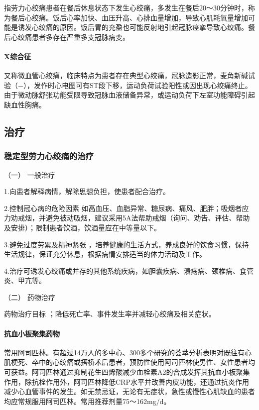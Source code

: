 指劳力心绞痛患者在餐后休息状态下发生心绞痛，多发生在餐后20～30分钟时，称为餐后心绞痛。饭后心率加快、血压升高、心排血量增加，导致心肌耗氧量增加可能是诱发心绞痛的原因。饭后胃的充盈也可能反射地引起冠脉痉挛导致心绞痛。餐后心绞痛患者多存在严重多支冠脉病变。

\paragraph{X综合征}

又称微血管心绞痛，临床特点为患者存在典型心绞痛，冠脉造影正常，麦角新碱试验（−），发作时心电图可有ST段下移，运动负荷试验阳性或因出现心绞痛终止。由于微动脉舒张功能受限导致冠脉血液储备异常，或运动负荷下左室功能障碍引起缺血性胸痛。

\subsection{治疗}

\subsubsection{稳定型劳力心绞痛的治疗}

\hypertarget{text00309.htmlux5cux23CHP10-7-3-1-1}{}
（一） 一般治疗

1.向患者解释病情，解除思想负担，使患者配合治疗。

2.控制冠心病的危险因素
如高血压、血脂异常、糖尿病、痛风、肥胖；吸烟者应力劝戒烟，并避免被动吸烟，建议采用5A法帮助戒烟（询问、劝告、评估、帮助及安排）；限制患者饮酒，饮酒量应在中等量以下。

3.避免过度劳累及精神紧张
，培养健康的生活方式，养成良好的饮食习惯，保持生活规律，保证充分休息，根据病情安排适当的体力活动及工作。

4.治疗可诱发心绞痛或并存的其他系统疾病，如胆囊疾病、溃疡病、颈椎病、食管炎、甲亢等。

\hypertarget{text00309.htmlux5cux23CHP10-7-3-1-2}{}
（二） 药物治疗

药物治疗目标 ；降低死亡率、事件发生率并减轻心绞痛及相关症状。

\paragraph{抗血小板聚集药物}

常用阿司匹林。有超过14万人的多中心、300多个研究的荟萃分析表明对既往有心肌梗死、卒中的心绞痛或搭桥术后患者，预防性使用阿司匹林使男性、女性患者均可获益。阿司匹林通过抑制花生四烯酸减少血栓素A2的合成发挥其抗血小板聚集作用，除抗栓作用外，阿司匹林降低CRP水平并改善内皮功能，还通过抗炎作用减少心血管事件的发生。如无禁忌证，无论有无症状，急性或慢性心肌缺血的患者均应常规服用阿司匹林。常用推荐剂量75～162mg/d。

